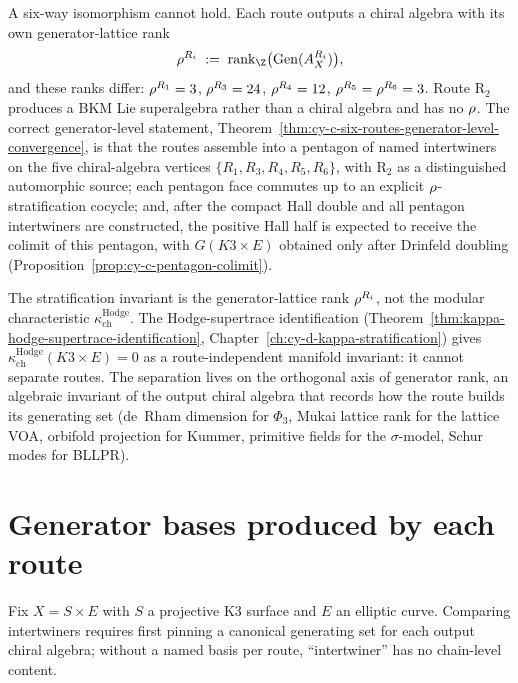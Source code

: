 A six-way isomorphism cannot hold. Each route outputs a chiral algebra with its own generator-lattice rank
\[
 \rhoR^{R_i} \;:=\; \mathrm{rank}_\Z\bigl(\mathrm{Gen}(A_X^{R_i})\bigr),
\]
and these ranks differ: $\rho^{R_1} = 3$, $\rho^{R_3} = 24$, $\rho^{R_4} = 12$, $\rho^{R_5} =
\rho^{R_6} = 3$. Route R$_2$ produces a BKM Lie superalgebra rather than a chiral algebra and has no
$\rho$. The correct generator-level statement, Theorem~\ref{thm:cy-c-six-routes-generator-level-convergence},
is that the routes assemble into a pentagon of named intertwiners on the five chiral-algebra vertices
$\{R_1, R_3, R_4, R_5, R_6\}$, with R$_2$ as a distinguished automorphic source; each pentagon face
commutes up to an explicit $\rho$-stratification cocycle; and, after
the compact Hall double and all pentagon intertwiners are constructed,
the positive Hall half is expected to receive the colimit of this pentagon,
with \(G(K3 \times E)\) obtained only after Drinfeld doubling
(Proposition~\ref{prop:cy-c-pentagon-colimit}).

The stratification invariant is the generator-lattice rank $\rho^{R_i}$, not the modular characteristic
\(\kappa_{\mathrm{ch}}^{\mathrm{Hodge}}\). The Hodge-supertrace identification (Theorem~\ref{thm:kappa-hodge-supertrace-identification},
Chapter~\ref{ch:cy-d-kappa-stratification}) gives \(\kappa_{\mathrm{ch}}^{\mathrm{Hodge}}(K3 \times E) = 0\) as a route-independent
manifold invariant: it cannot separate routes. The separation lives on the orthogonal axis of
generator rank, an algebraic invariant of the output chiral algebra that records how the route builds
its generating set (de~Rham dimension for $\Phi_3$, Mukai lattice rank for the lattice VOA, orbifold
projection for Kummer, primitive fields for the $\sigma$-model, Schur modes for BLLPR).

\section{Generator bases produced by each route}
\label{sec:cy-c-gl-bases}

Fix $X = S \times E$ with $S$ a projective K3 surface and $E$ an elliptic curve. Comparing intertwiners
requires first pinning a canonical generating set for each output chiral algebra; without a named basis per
route, ``intertwiner'' has no chain-level content.

